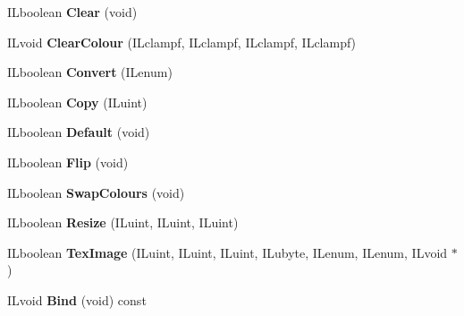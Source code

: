 \begin{DoxyCompactItemize}
\item 
\hypertarget{classil_image_a202758160e65bda0a4135e133cd87112}{I\+Lboolean {\bfseries Clear} (void)}\label{classil_image_a202758160e65bda0a4135e133cd87112}

\item 
\hypertarget{classil_image_a61e2c49839a48e56af595f95e52fde76}{I\+Lvoid {\bfseries Clear\+Colour} (I\+Lclampf, I\+Lclampf, I\+Lclampf, I\+Lclampf)}\label{classil_image_a61e2c49839a48e56af595f95e52fde76}

\item 
\hypertarget{classil_image_a6b0991b943109549e874ae3a5c161ee6}{I\+Lboolean {\bfseries Convert} (I\+Lenum)}\label{classil_image_a6b0991b943109549e874ae3a5c161ee6}

\item 
\hypertarget{classil_image_a0cb50014832fdb0ac45a345804c8da50}{I\+Lboolean {\bfseries Copy} (I\+Luint)}\label{classil_image_a0cb50014832fdb0ac45a345804c8da50}

\item 
\hypertarget{classil_image_a981280302a80e0d2e68d1229cb70c60f}{I\+Lboolean {\bfseries Default} (void)}\label{classil_image_a981280302a80e0d2e68d1229cb70c60f}

\item 
\hypertarget{classil_image_a83331e94a466f7d3e55975928d476711}{I\+Lboolean {\bfseries Flip} (void)}\label{classil_image_a83331e94a466f7d3e55975928d476711}

\item 
\hypertarget{classil_image_a470e3a5cc20ec88017d216b1af497f9e}{I\+Lboolean {\bfseries Swap\+Colours} (void)}\label{classil_image_a470e3a5cc20ec88017d216b1af497f9e}

\item 
\hypertarget{classil_image_aeefe83c3a39c37600868c29d4afb8294}{I\+Lboolean {\bfseries Resize} (I\+Luint, I\+Luint, I\+Luint)}\label{classil_image_aeefe83c3a39c37600868c29d4afb8294}

\item 
\hypertarget{classil_image_a06975135177b41ea110cc562944612f4}{I\+Lboolean {\bfseries Tex\+Image} (I\+Luint, I\+Luint, I\+Luint, I\+Lubyte, I\+Lenum, I\+Lenum, I\+Lvoid $\ast$)}\label{classil_image_a06975135177b41ea110cc562944612f4}

\item 
\hypertarget{classil_image_a9fa98cb1d6ff8cb2ede1f3f0dad7eaa1}{I\+Lvoid {\bfseries Bind} (void) const }\label{classil_image_a9fa98cb1d6ff8cb2ede1f3f0dad7eaa1}


\end{DoxyCompactItemize}
